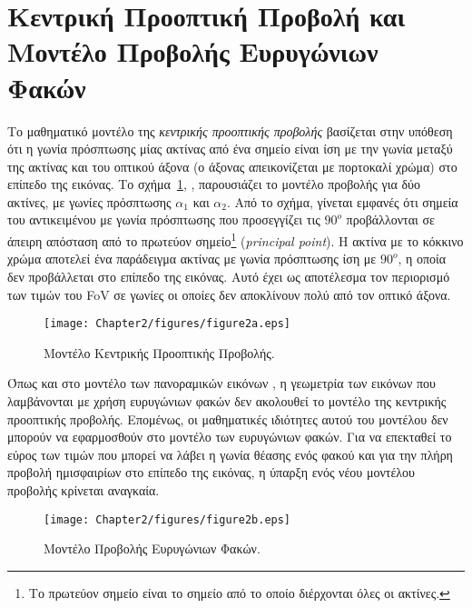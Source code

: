 \section{Κεντρική Προοπτική Προβολή και Μοντέλο Προβολής Ευρυγώνιων Φακών}
\label{section:sect22}
\indent
Το μαθηματικό μοντέλο της \textsl{κεντρικής προοπτικής προβολής} βασίζεται στην υπόθεση ότι η γωνία πρόσπτωσης μίας ακτίνας από ένα σημείο είναι ίση με την γωνία μεταξύ της ακτίνας και του οπτικού άξονα (ο άξονας απεικονίζεται με πορτοκαλί χρώμα) στο επίπεδο της εικόνας. Το σχήμα~\ref{figure:fig22a}, \cite{Schwalbe05}, παρουσιάζει το μοντέλο προβολής για δύο ακτίνες, με γωνίες πρόσπτωσης \(\alpha_{1}\) και \(\alpha_{2}\). Από το σχήμα, γίνεται εμφανές ότι σημεία του αντικειμένου με γωνία πρόσπτωσης που προσεγγίζει τις \(90^{o}\) προβάλλονται σε άπειρη απόσταση από το πρωτεύον σημείο\footnote{\small Το πρωτεύον σημείο είναι το σημείο από το οποίο διέρχονται όλες οι ακτίνες.} (\textsl{principal point}). Η ακτίνα με το κόκκινο χρώμα αποτελεί ένα παράδειγμα ακτίνας με γωνία πρόσπτωσης ίση με \(90^{o}\), η οποία δεν προβάλλεται στο επίπεδο της εικόνας. Αυτό έχει ως αποτέλεσμα τον περιορισμό των τιμών του \ac{FoV} σε γωνίες οι οποίες δεν αποκλίνουν πολύ από τον οπτικό άξονα.

\begin{figure}
\centering
\texttt{[image: Chapter2/figures/figure2a.eps]}
\caption{Μοντέλο Κεντρικής Προοπτικής Προβολής.}
\label{figure:fig22a}
\end{figure}

\indent
Όπως και στο μοντέλο των πανοραμικών εικόνων \cite{Schneider}, η γεωμετρία των εικόνων που λαμβάνονται με χρήση ευρυγώνιων φακών δεν ακολουθεί το μοντέλο της κεντρικής προοπτικής προβολής. Επομένως, οι μαθηματικές ιδιότητες αυτού του μοντέλου δεν μπορούν να εφαρμοσθούν στο μοντέλο των ευρυγώνιων φακών. Για να επεκταθεί το εύρος των τιμών που μπορεί να λάβει η γωνία θέασης ενός φακού και για την πλήρη προβολή ημισφαιρίων στο επίπεδο της εικόνας, η ύπαρξη ενός νέου μοντέλου προβολής κρίνεται αναγκαία.

\begin{figure}
\centering
\texttt{[image: Chapter2/figures/figure2b.eps]}
\caption{Μοντέλο Προβολής Ευρυγώνιων Φακών.}
\label{figure:fig22b}
\end{figure}

